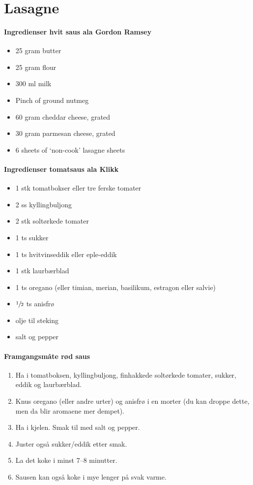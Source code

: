 \section{﻿Lasagne}


\paragraph{Ingredienser hvit saus ala Gordon Ramsey}
\begin{itemize}[noitemsep]
  \item 25 gram butter
  \item 25 gram flour
  \item 300 ml milk
  \item Pinch of ground nutmeg
  \item 60 gram cheddar cheese, grated
  \item 30 gram parmesan cheese, grated
  \item 6 sheets of `non-cook' lasagne sheets
\end{itemize}

\paragraph{Ingredienser tomatsaus ala Klikk}
\begin{itemize}[noitemsep]
  \item 1 stk tomatbokser eller tre ferske tomater
  \item 2 ss kyllingbuljong
  \item 2 stk soltørkede tomater
  \item 1 ts sukker
  \item 1 ts hvitvinseddik eller eple-eddik
  \item 1 stk laurbærblad
  \item 1 ts oregano (eller timian, merian, basilikum, estragon eller salvie)
  \item  $\sfrac{1}{2}$  ts anisfrø
  \item olje til steking
  \item salt og pepper
\end{itemize}

\paragraph{Framgangsmåte rød saus}
\begin{enumerate}[noitemsep]
  \item Ha i tomatboksen, kyllingbuljong, finhakkede soltørkede tomater, sukker, eddik og laurbærblad.
  \item Knus oregano (eller andre urter) og anisfrø i en morter (du kan droppe dette, men da blir aromaene mer dempet).
  \item Ha i kjelen. Smak til med salt og pepper.
  \item Juster også sukker/eddik etter smak.
  \item La det koke i minst 7--8 minutter.
  \item Sausen kan også koke i mye lenger på svak varme.
  \end{enumerate}

